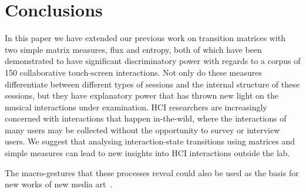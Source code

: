\documentclass{sigchi}
\begin{document}
\section{Conclusions}

In this paper we have extended our previous work on transition
matrices with two simple matrix measures, flux and entropy, both of
which have been demonstrated to have significant discriminatory power
with regards to a corpus of 150 collaborative touch-screen
interactions. Not only do these measures differentiate between
different types of sessions and the internal structure of these
sessions, but they have explanatory power that has thrown new light on
the musical interactions under examination. HCI researchers are
increasingly concerned with interactions that happen in-the-wild,
where the interactions of many users may be collected without the
opportunity to survey or interview users. We suggest that analysing
interaction-state transitions using matrices and simple measures can
lead to new insights into HCI interactions outside the lab. 


The macro-gestures that these processes reveal could also be used as
the basis for new works of new media art~\cite{Manovich:2002ly}.




\end{document}
